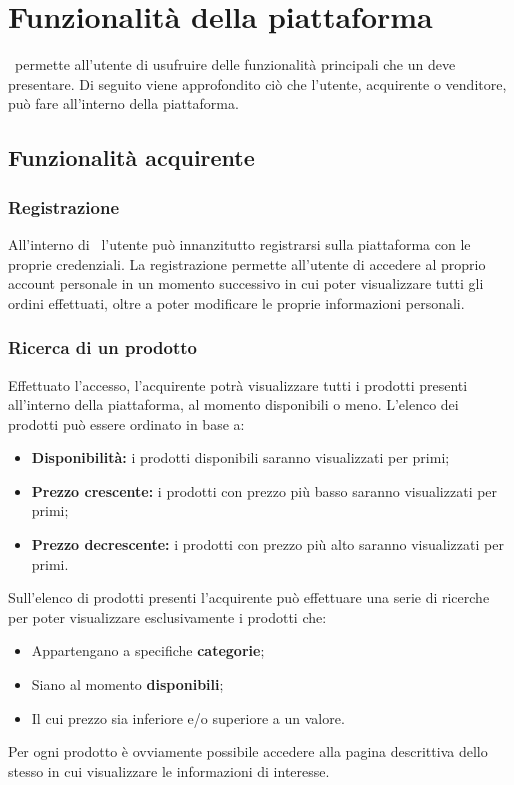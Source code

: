 \section{Funzionalità della piattaforma}
\NomeProgetto\ permette all'utente di usufruire delle funzionalità principali che un  deve presentare. Di seguito viene approfondito ciò che l'utente, acquirente o venditore, può fare all'interno della piattaforma.
\subsection{Funzionalità acquirente}\label{FunzionalitàAcq}
\subsubsection*{Registrazione}
All'interno di \NomeProgetto\ l'utente può innanzitutto registrarsi sulla piattaforma con le proprie credenziali. La registrazione permette all'utente di accedere al proprio account personale in un momento successivo in cui poter visualizzare tutti gli ordini effettuati, oltre a poter modificare le proprie informazioni personali.
\subsubsection*{Ricerca di un prodotto}
Effettuato l'accesso, l'acquirente potrà visualizzare tutti i prodotti presenti all'interno della piattaforma, al momento disponibili o meno. L'elenco dei prodotti può essere ordinato in base a:
\begin{itemize}
	\item \textbf{Disponibilità:} i prodotti disponibili saranno visualizzati per primi;
	\item \textbf{Prezzo crescente:} i prodotti con prezzo più basso saranno visualizzati per primi;
	\item \textbf{Prezzo decrescente:} i prodotti con prezzo più alto saranno visualizzati per primi.
\end{itemize}
Sull'elenco di prodotti presenti l'acquirente può effettuare una serie di ricerche per poter visualizzare esclusivamente i prodotti che:
\begin{itemize}
	\item Appartengano a specifiche \textbf{categorie};
	\item Siano al momento \textbf{disponibili};
	\item Il cui prezzo sia inferiore e/o superiore a un valore.
\end{itemize}
Per ogni prodotto è ovviamente possibile accedere alla pagina descrittiva dello stesso in cui visualizzare le informazioni di interesse.
